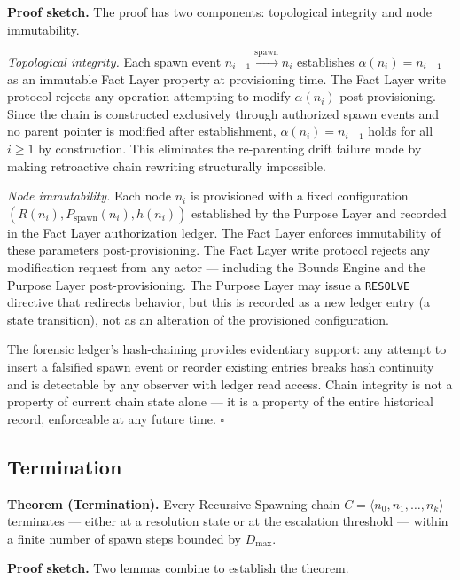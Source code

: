 \medskip
\noindent\textbf{Proof sketch.} The proof has two components: topological integrity and node immutability.

\medskip
\textit{Topological integrity.} Each spawn event $n_{i-1} \xrightarrow{\mathrm{spawn}} n_i$ establishes $\alpha(n_i) = n_{i-1}$ as an immutable Fact Layer property at provisioning time. The Fact Layer write protocol rejects any operation attempting to modify $\alpha(n_i)$ post-provisioning. Since the chain is constructed exclusively through authorized spawn events and no parent pointer is modified after establishment, $\alpha(n_i) = n_{i-1}$ holds for all $i \geq 1$ by construction. This eliminates the re-parenting drift failure mode by making retroactive chain rewriting structurally impossible.

\medskip
\textit{Node immutability.} Each node $n_i$ is provisioned with a fixed configuration $(R(n_i), P_{\mathrm{spawn}}(n_i), h(n_i))$ established by the Purpose Layer and recorded in the Fact Layer authorization ledger. The Fact Layer enforces immutability of these parameters post-provisioning. The Fact Layer write protocol rejects any modification request from any actor — including the Bounds Engine and the Purpose Layer post-provisioning. The Purpose Layer may issue a \texttt{RESOLVE} directive that redirects behavior, but this is recorded as a new ledger entry (a state transition), not as an alteration of the provisioned configuration.

The forensic ledger's hash-chaining provides evidentiary support: any attempt to insert a falsified spawn event or reorder existing entries breaks hash continuity and is detectable by any observer with ledger read access. Chain integrity is not a property of current chain state alone — it is a property of the entire historical record, enforceable at any future time. $\square$

\subsection{Termination}
\label{sec:rs-termination}

\medskip
\noindent\textbf{Theorem (Termination).} Every Recursive Spawning chain $C = \langle n_0, n_1, \ldots, n_k \rangle$ terminates — either at a resolution state or at the escalation threshold — within a finite number of spawn steps bounded by $D_{\mathrm{max}}$.

\medskip
\noindent\textbf{Proof sketch.} Two lemmas combine to establish the theorem.

